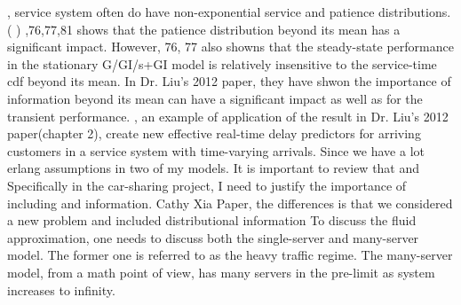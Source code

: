 , service system often do have non-exponential service and patience distributions. ( )\markdownRendererUlItemEnd 
{},76,77,81 shows that the patience distribution beyond its mean has a significant impact. However, 76, 77 also showns that the steady-state performance in the stationary \markdownRendererDollarSign{}G/GI/s+GI\markdownRendererDollarSign{} model is relatively insensitive to the service-time cdf beyond its mean.\markdownRendererUlItemEnd 
\markdownRendererUlItem In Dr. Liu's 2012 paper, they have shwon the importance of information beyond its mean can have a significant impact as well as for the transient performance.\markdownRendererUlItemEnd 
{}, an example of application of the result in Dr. Liu's 2012 paper(chapter 2), create new effective real-time delay predictors for arriving customers in a service system with time-varying arrivals.\markdownRendererUlItemEnd 
\markdownRendererUlEndTight \markdownRendererInterblockSeparator
{}\markdownRendererInterblockSeparator
{}Since we have a lot erlang assumptions in two of my models. It is important to review that and \markdownRendererInterblockSeparator
{}\markdownRendererInterblockSeparator
{}Specifically in the car-sharing project, I need to justify the importance of including  and  information.\markdownRendererInterblockSeparator
{}\markdownRendererUlBeginTight
\markdownRendererUlItem Cathy Xia Paper, the differences is that we considered a new problem and included distributional information\markdownRendererUlItemEnd 
\markdownRendererUlEndTight \markdownRendererInterblockSeparator
{}\markdownRendererHorizontalRule{}\markdownRendererInterblockSeparator
{}\markdownRendererInterblockSeparator
{}To discuss the fluid approximation, one needs to discuss both the single-server and many-server model. The former one is referred to as the  heavy traffic regime. The many-server model, from a math point of view, has  many servers in the pre-limit as system  increases to infinity.\markdownRendererInterblockSeparator
